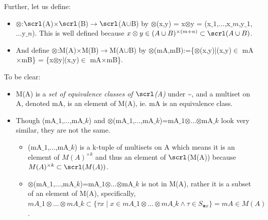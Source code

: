 \documentclass[12pt,a4paper]{article}
\begin{document}
Further, let us define:

\begin{itemize}
\item \ensuremath{\otimes}:\ensuremath{\scrl}(A)\ensuremath{\times}\ensuremath{\scrl}(B)\ensuremath{\rightarrow}\ensuremath{\scrl}(A\ensuremath{\cup}B) by \ensuremath{\otimes}(x,y) = x\ensuremath{\otimes}y = (x\ensuremath{\_1},\ensuremath{\ldots},x\ensuremath{\_m},y\ensuremath{\_1},\ensuremath{\ldots}y\ensuremath{\_n}). This is well defined because $x\ensuremath{\otimes}y\ensuremath{\in}(A\ensuremath{\cup}B)^{\ensuremath{\times}(m+n)} \ensuremath{\subset} \ensuremath{\scrl}(A\ensuremath{\cup}B)$.


\item And define \ensuremath{\otimes}:M(A)\ensuremath{\times}M(B)\ensuremath{\rightarrow}M(A\ensuremath{\cup}B) by \ensuremath{\otimes}(mA,mB):=\{\ensuremath{\otimes}(x,y)|(x,y)\ensuremath{\in} mA\ensuremath{\times}mB\} = \{x\ensuremath{\otimes}y|(x,y)\ensuremath{\in} mA\ensuremath{\times}mB\}.

\end{itemize}

To be clear:

\begin{itemize}
\item M(A) is a \emph{set of equivalence classes of \ensuremath{\scrl}(A)} under {\textasciitilde}, and a multiset on A, denoted mA, is an element of M(A), ie. mA is an equivalence class.


\item Though (mA\ensuremath{\_1},\ensuremath{\ldots},mA\ensuremath{\_k}) and \ensuremath{\otimes}(mA\ensuremath{\_1},\ensuremath{\ldots},mA\ensuremath{\_k})=mA\ensuremath{\_1}\ensuremath{\otimes}\ensuremath{\ldots}\ensuremath{\otimes}mA\ensuremath{\_k} look very similar, they are not the same.

\begin{itemize}
\item (mA\ensuremath{\_1},\ensuremath{\ldots},mA\ensuremath{\_k}) is a k-tuple of multisets on A which means it is an element of $M(A)^{\ensuremath{\times}k}$ and thus an element of \ensuremath{\scrl}(M(A)) because $M(A)^{\ensuremath{\times}k} \ensuremath{\subset} \ensuremath{\scrl}(M(A))$.


\item \ensuremath{\otimes}(mA\ensuremath{\_1},\ensuremath{\ldots},mA\ensuremath{\_k})=mA\ensuremath{\_1}\ensuremath{\otimes}\ensuremath{\ldots}\ensuremath{\otimes}mA\ensuremath{\_k} is not in M(A), rather it is a subset of an element of M(A), specifically, $mA\ensuremath{\_1}\ensuremath{\otimes}\ensuremath{\ldots}\ensuremath{\otimes}mA\ensuremath{\_k} \ensuremath{\subset} \{ \ensuremath{\tau}x \ensuremath{\mid} x\ensuremath{\in}mA\ensuremath{\_1}\ensuremath{\otimes}\ensuremath{\ldots}\ensuremath{\otimes}mA\ensuremath{\_k} \ensuremath{\wedge} \ensuremath{\tau}\ensuremath{\in}S_{\ensuremath{\smashtimes}x} \} = mA \ensuremath{\in} M(A)$.

\end{itemize}
\end{itemize}
\end{document}
